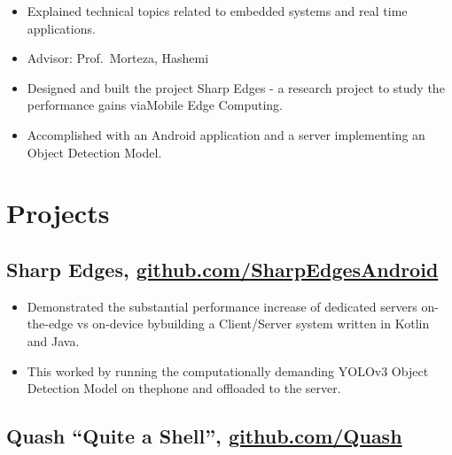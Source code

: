 \documentclass{mycv}
\begin{document}
\begin{itemize}
    \item Explained technical topics related to embedded systems and real time applications.
\end{itemize}
 
\vspace{+\parskip}%

\begin{positions}
\end{positions}

\begin{itemize}
  \item Advisor: {Prof.~Morteza, Hashemi}
  \item Designed and built the project Sharp Edges - a research project to study the performance gains viaMobile Edge Computing.
  \item Accomplished with an Android application and a server implementing an Object Detection Model.
\end{itemize}

\vspace{-\parskip}%

\section{Projects}

\subsection{Sharp Edges\normalfont, \href{http://github.com/erjseals/SharpEdgesAndroid}{github.com/SharpEdgesAndroid}}

\begin{itemize}
    \item Demonstrated the substantial performance increase of dedicated servers on-the-edge vs on-device bybuilding a Client/Server system written in Kotlin and Java.
    \item This worked by running the computationally demanding YOLOv3 Object Detection Model on thephone and offloaded to the server.
\end{itemize}

\subsection{Quash “Quite a Shell”\normalfont, \href{http://github.com/erjseals/Quash}{github.com/Quash}}
\end{document}
